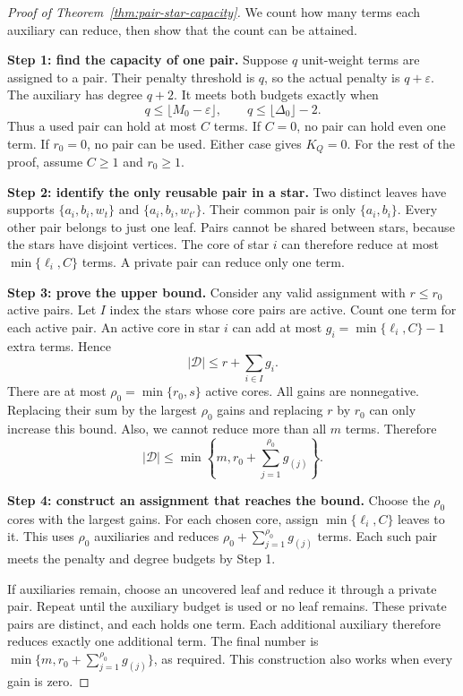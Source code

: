 \documentclass[a4paper,onecolumn,11pt,unpublished]{quantumarticle}
\theoremstyle{remark}
\begin{document}
\begin{proof}[Proof of Theorem~\ref{thm:pair-star-capacity}]
We count how many terms each auxiliary can reduce, then show that the count
can be attained.

\textbf{Step 1: find the capacity of one pair.}
Suppose $q$ unit-weight terms are assigned to a pair.
Their penalty threshold is $q$, so the actual penalty is $q+\varepsilon$.
The auxiliary has degree $q+2$.
It meets both budgets exactly when
\[
q\leq\lfloor M_0-\varepsilon\rfloor,
\qquad q\leq\lfloor\Delta_0\rfloor-2.
\]
Thus a used pair can hold at most $C$ terms.
If $C=0$, no pair can hold even one term. If $r_0=0$, no pair can be used.
Either case gives $K_Q=0$.
For the rest of the proof, assume $C\geq1$ and $r_0\geq1$.

\textbf{Step 2: identify the only reusable pair in a star.}
Two distinct leaves have supports $\{a_i,b_i,w_t\}$ and
$\{a_i,b_i,w_{t'}\}$. Their common pair is only $\{a_i,b_i\}$.
Every other pair belongs to just one leaf.
Pairs cannot be shared between stars, because the stars have disjoint vertices.
The core of star $i$ can therefore reduce at most $\min\{\ell_i,C\}$ terms.
A private pair can reduce only one term.

\textbf{Step 3: prove the upper bound.}
Consider any valid assignment with $r\leq r_0$ active pairs.
Let $I$ index the stars whose core pairs are active.
Count one term for each active pair. An active core in star $i$ can add
at most $g_i=\min\{\ell_i,C\}-1$ extra terms. Hence
\[
|\mathcal D|\leq r+\sum_{i\in I}g_i.
\]
There are at most $\rho_0=\min\{r_0,s\}$ active cores.
All gains are nonnegative. Replacing their sum by the largest $\rho_0$
gains and replacing $r$ by $r_0$ can only increase this bound.
Also, we cannot reduce more than all $m$ terms. Therefore
\[
|\mathcal D|\leq
\min\left\{m,r_0+\sum_{j=1}^{\rho_0}g_{(j)}\right\}.
\]

\textbf{Step 4: construct an assignment that reaches the bound.}
Choose the $\rho_0$ cores with the largest gains.
For each chosen core, assign $\min\{\ell_i,C\}$ leaves to it.
This uses $\rho_0$ auxiliaries and reduces
$\rho_0+\sum_{j=1}^{\rho_0}g_{(j)}$ terms.
Each such pair meets the penalty and degree budgets by Step 1.

If auxiliaries remain, choose an uncovered leaf and reduce it through a
private pair. Repeat until the auxiliary budget is used or no leaf remains.
These private pairs are distinct, and each holds one term.
Each additional auxiliary therefore reduces exactly one additional term.
The final number is
$\min\{m,r_0+\sum_{j=1}^{\rho_0}g_{(j)}\}$, as required.
This construction also works when every gain is zero.
\end{proof}
\end{document}
